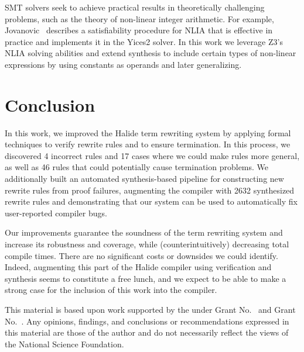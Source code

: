 \documentclass[sigplan,10pt,review,anonymous]{acmart}\settopmatter{printfolios=true,printccs=false,printacmref=false}
\newcommand{\NumRulesFixed}{{\color{black} 4}\xspace}
\newcommand{\NumPredicatesRelaxed}{{\color{black} 17}\xspace}
\newcommand{\NumOrderingProblems}{{\color{black} 46}\xspace}
\newcommand{\NumRulesSynthesized}{{\color{black} 2632}\xspace}
\begin{document}
SMT solvers seek to achieve practical results in theoretically challenging problems, such as the theory of non-linear integer arithmetic. For example, Jovanovic~\cite{jovanovic2017solving} describes a satisfiability procedure for NLIA that is effective in practice and implements it in the Yices2 solver. In this work we leverage Z3's NLIA solving abilities and extend synthesis to include certain types of non-linear expressions by using constants as operands and later generalizing.

\section{Conclusion}
In this work, we improved the Halide term rewriting system by applying formal
techniques to verify rewrite rules and to ensure termination.  In this process,
we discovered \NumRulesFixed incorrect rules and \NumPredicatesRelaxed cases
where we could make rules more general, as well as \NumOrderingProblems rules
that could potentially cause termination problems.  We additionally built
an automated synthesis-based pipeline for constructing new rewrite rules from
proof failures, augmenting the compiler with \NumRulesSynthesized synthesized
rewrite rules and demonstrating that our system can be used to automatically fix
user-reported compiler bugs.

Our improvements guarantee the soundness of the term rewriting system
and increase its robustness and coverage, while (counterintuitively)
decreasing total compile times. There are no significant costs or
downsides we could identify. Indeed, augmenting this part of the
Halide compiler using verification and synthesis seems to constitute a
free lunch, and we expect to be able to make a strong case for the
inclusion of this work into the compiler.


\begin{acks}                            %
  This material is based upon work supported by the
   under Grant
  No.~ and Grant
  No.~.  Any opinions, findings, and
  conclusions or recommendations expressed in this material are those
  of the author and do not necessarily reflect the views of the
  National Science Foundation.
\end{acks}
\end{document}
